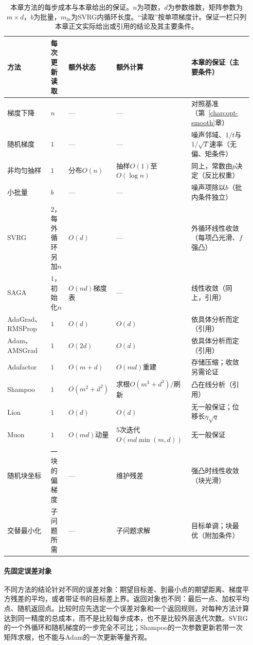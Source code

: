 \begin{table}[!htbp]
  \centering
  \caption{本章方法的每步成本与本章给出的保证。$n$为项数，$d$为参数维数，矩阵参数为$m\times d$，$b$为批量，$m_{\mathrm{in}}$为SVRG内循环长度。“读取”按单项梯度计。保证一栏只列本章正文实际给出或引用的结论及其主要条件。}
  \label{tab:opt-sto-costs}
  \footnotesize
  \begin{tabularx}{\linewidth}{@{}l>{\raggedright\arraybackslash}p{24mm}>{\raggedright\arraybackslash}p{20mm}>{\raggedright\arraybackslash}p{26mm}>{\raggedright\arraybackslash}X@{}}
    \toprule
    方法 & 每次更新读取 & 额外状态 & 额外计算 & 本章的保证（主要条件）\\
    \midrule
    梯度下降 & $n$ & — & — & 对照基准（第~\ref{chap:opt-smooth}章）\\
    随机梯度 & $1$ & — & — & 噪声邻域、$1/t$与$1/\sqrt T$速率（无偏、矩条件）\\
    非均匀抽样 & $1$ & 分布$O(n)$ & 抽样$O(1)$至$O(\log n)$ & 同上，常数由$p$决定（反比权重）\\
    小批量 & $b$ & — & — & 噪声项除以$b$（批内条件独立）\\
    SVRG & $2$，每外循环另加$n$ & $O(d)$ & — & 外循环线性收敛（每项凸光滑、$f$强凸）\\
    SAGA & $1$，初始化$n$ & $O(nd)$梯度表 & — & 线性收敛（同上，引用）\\
    AdaGrad、RMSProp & $1$ & $O(d)$ & $O(d)$ & 依具体分析而定（引用）\\
    Adam、AMSGrad & $1$ & $O(2d)$ & $O(d)$ & 依具体分析而定（引用）\\
    Adafactor & $1$ & $O(m+d)$ & $O(md)$重建 & 存储压缩；收敛另需论证\\
    Shampoo & $1$ & $O(m^2+d^2)$ & 求根$O(m^3+d^3)$/刷新 & 凸在线分析（引用）\\
    Lion & $1$ & $O(d)$ & $O(d)$ & 无一般保证；位移长$\eta\sqrt q$\\
    Muon & $1$ & $O(md)$动量 & $5$次迭代$O(md\min(m,d))$ & 无一般保证\\
    随机块坐标 & 一块的偏梯度 & — & 维护残差 & 强凸时线性收敛（块光滑）\\
    交替最小化 & 子问题所需 & — & 子问题求解 & 目标单调；块最优（附加条件）\\
    \bottomrule
  \end{tabularx}
\end{table}

\paragraph{先固定误差对象}
不同方法的结论针对不同的误差对象：期望目标差、到最小点的期望距离、梯度平方残差的平均，或者带证书的目标差上界。返回对象也不同：最后一点、加权平均点、随机返回点。比较时应先选定一个误差对象和一个返回规则，对每种方法计算达到同一精度的总成本，而不是比较每步成本，也不是比较外层迭代次数。SVRG的一个外循环和随机梯度的一步完全不可比；Shampoo的一次参数更新若带一次矩阵求根，也不能与Adam的一次更新等量齐观。

